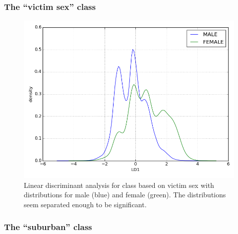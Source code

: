 \documentclass{evanarticle}
\begin{document}
\subsubsection{The ``victim sex'' class}

\begin{figure}[H]
  \centering
    \includegraphics[width=\linewidth]{images/vict_sex/vict_sex.png}
  \caption{Linear discriminant analysis for class based on victim sex with distributions for male (blue) and female (green).  The distributions seem separated enough to be significant.}
\end{figure}

\subsubsection{The ``suburban'' class}
\end{document}
